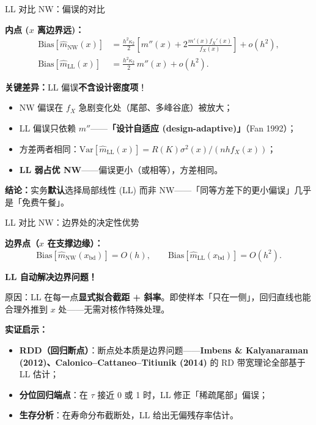 \documentclass[aspectratio=169, 10pt]{beamer}
\begin{document}
\begin{frame}{LL 对比 NW：偏误的对比}

  \begin{highlightbox}
    \textbf{内点 ($x$ 离边界远)：}
    \begin{align*}
      \text{Bias}[\hat m_{\text{NW}}(x)] &= \frac{h^2\kappa_2}{2}\left[m''(x) + 2\frac{m'(x)f_X'(x)}{f_X(x)}\right] + o(h^2), \\
      \text{Bias}[\hat m_{\text{LL}}(x)] &= \frac{h^2\kappa_2}{2}\, m''(x) + o(h^2).
    \end{align*}
  \end{highlightbox}

  \begin{keybox}
    \textbf{关键差异：}LL 偏误\textbf{不含设计密度项}！
    \begin{itemize}
      \item NW 偏误在 $f_X$ 急剧变化处（尾部、多峰谷底）被放大；
      \item LL 偏误只依赖 $m''$——\textbf{「设计自适应 (design-adaptive)」}（Fan 1992）；
      \item 方差两者相同：$\text{Var}[\hat m_{\text{LL}}(x)] = R(K)\sigma^2(x)/(nhf_X(x))$；
      \item \textbf{LL 弱占优 NW}——偏误更小（或相等），方差相同。
    \end{itemize}
  \end{keybox}

  \vspace{0.3em}
  \textbf{结论：}实务\textbf{默认}选择局部线性 (LL) 而非 NW——「同等方差下的更小偏误」几乎是「免费午餐」。

\end{frame}


\begin{frame}{LL 对比 NW：边界处的决定性优势}

  \textbf{边界点（$x$ 在支撑边缘）：}
  \[
    \text{Bias}[\hat m_{\text{NW}}(x_{\text{bd}})] = O(h),\qquad
    \text{Bias}[\hat m_{\text{LL}}(x_{\text{bd}})] = O(h^2).
  \]

  \begin{highlightbox}
    \textbf{LL 自动解决边界问题！}
    \vspace{0.2em}

    原因：LL 在每一点\textbf{显式拟合截距 + 斜率}。即使样本「只在一侧」，回归直线也能合理外推到 $x$ 处——无需对核作特殊处理。
  \end{highlightbox}


  \begin{keybox}
    \textbf{实证启示：}
    \begin{itemize}
      \item \textbf{RDD（回归断点）}：断点处本质是边界问题——\textbf{Imbens \& Kalyanaraman (2012)、Calonico--Cattaneo--Titiunik (2014)} 的 RD 带宽理论全部基于 LL 估计；
      \item \textbf{分位回归端点}：在 $\tau$ 接近 0 或 1 时，LL 修正「稀疏尾部」偏误；
      \item \textbf{生存分析}：在寿命分布截断处，LL 给出无偏残存率估计。
    \end{itemize}
  \end{keybox}

\end{frame}
\end{document}
